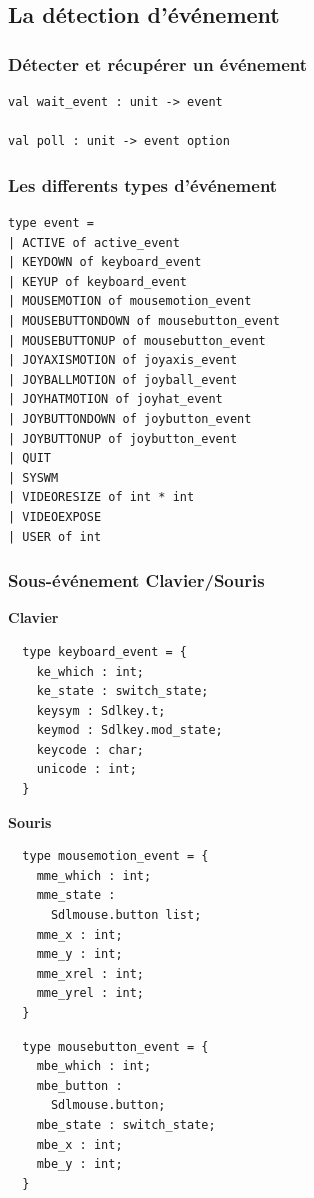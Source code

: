 \subsection{La détection d'événement} %
\begin{frame}[fragile]
	\frametitle{Détecter et récupérer un événement}
	\begin{lstlisting}
val wait_event : unit -> event

val poll : unit -> event option
	\end{lstlisting}
\end{frame}

\begin{frame}[fragile]
	\frametitle{Les differents types d'événement}
	\lstset{basicstyle=\small}
	\begin{lstlisting}
type event =
| ACTIVE of active_event
| KEYDOWN of keyboard_event
| KEYUP of keyboard_event
| MOUSEMOTION of mousemotion_event
| MOUSEBUTTONDOWN of mousebutton_event
| MOUSEBUTTONUP of mousebutton_event
| JOYAXISMOTION of joyaxis_event
| JOYBALLMOTION of joyball_event
| JOYHATMOTION of joyhat_event
| JOYBUTTONDOWN of joybutton_event
| JOYBUTTONUP of joybutton_event
| QUIT
| SYSWM
| VIDEORESIZE of int * int
| VIDEOEXPOSE
| USER of int
	\end{lstlisting}
\end{frame}

\begin{frame}[fragile]
	\frametitle{Sous-événement Clavier/Souris}
	\textbf{Clavier}
	\lstset{basicstyle=\scriptsize}
	\begin{lstlisting}
  type keyboard_event = {
    ke_which : int;
    ke_state : switch_state;
    keysym : Sdlkey.t;
    keymod : Sdlkey.mod_state;
    keycode : char;
    unicode : int;
  }
	\end{lstlisting}
	\textbf{Souris}\\
	\begin{minipage}{0.47\textwidth}
		\begin{lstlisting}
  type mousemotion_event = {
    mme_which : int;
    mme_state : 
      Sdlmouse.button list;
    mme_x : int;
    mme_y : int;
    mme_xrel : int;
    mme_yrel : int;
  }
		\end{lstlisting}
	\end{minipage}
	\begin{minipage}{0.4\textwidth}
		\begin{lstlisting}
  type mousebutton_event = {
    mbe_which : int;
    mbe_button : 
      Sdlmouse.button;
    mbe_state : switch_state;
    mbe_x : int;
    mbe_y : int;
  }
		\end{lstlisting}
	\end{minipage}
\end{frame}

